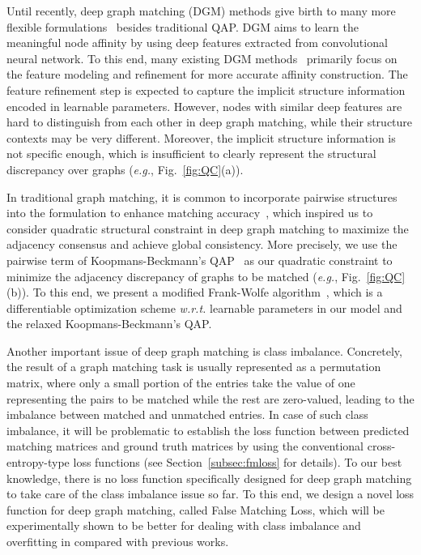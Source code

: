 \documentclass[final]{cvpr}
\begin{document}
Until recently, deep graph matching (DGM) methods give birth to many more flexible formulations~\cite{fey2020deep,rolinek2020deep,wang2019learning,yu2020learning} besides traditional QAP. DGM aims to learn the meaningful node affinity by using deep features extracted from convolutional neural network. To this end, many existing DGM methods~\cite{rolinek2020deep,wang2019learning,yu2020learning} primarily focus on the feature modeling and refinement for more accurate affinity construction. The feature refinement step is expected to capture the implicit structure information~\cite{wang2019learning} encoded in learnable parameters.
However, nodes with similar deep features are hard to distinguish from each other in deep graph matching, while their structure contexts may be very different. Moreover, the implicit structure information is not specific enough, which is insufficient to clearly represent the structural discrepancy over graphs ({\em e.g.}, Fig.~\ref{fig:QC}(a)).


In traditional graph matching, it is common to
incorporate pairwise structures into the formulation to enhance matching accuracy~\cite{leordeanu2005spectral}, which inspired us to consider quadratic structural constraint in deep graph matching to maximize the adjacency consensus and achieve global consistency. More precisely, we use the pairwise term of Koopmans-Beckmann’s QAP~\cite{loiola2007survey} as our quadratic constraint to minimize the adjacency discrepancy of graphs to be matched ({\em e.g.}, Fig.~\ref{fig:QC}(b)). To this end, we present a modified Frank-Wolfe algorithm~\cite{lacoste2015global}, which is a differentiable optimization scheme {\em w.r.t.} learnable parameters in our model and the relaxed Koopmans-Beckmann’s QAP.

Another important issue of deep graph matching is class imbalance. Concretely, the result of a graph matching task is usually represented as a permutation matrix, where only a small portion of the entries take the value of one representing the pairs to be matched while the rest are zero-valued, leading to the imbalance between matched and unmatched entries. In case of such class imbalance, it will be problematic to establish the loss function between predicted matching matrices and ground truth matrices by using the conventional cross-entropy-type loss functions (see Section~\ref{subsec:fmloss} for details). To our best knowledge, there is no loss function specifically designed for deep graph matching to take care of the class imbalance issue so far. To this end, we design a novel loss function for deep graph matching, called False Matching Loss, which will be experimentally shown to be better for dealing with class imbalance and overfitting in compared with previous works.
\end{document}

